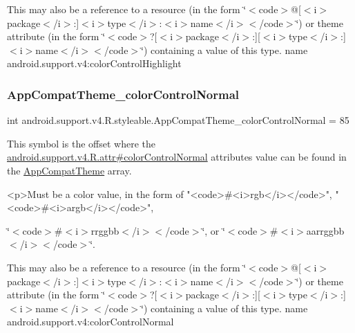 This may also be a reference to a resource (in the form \char`\"{}$<$code$>$@\mbox{[}$<$i$>$package$<$/i$>$\+:\mbox{]}$<$i$>$type$<$/i$>$\+:$<$i$>$name$<$/i$>$$<$/code$>$\char`\"{}) or theme attribute (in the form \char`\"{}$<$code$>$?\mbox{[}$<$i$>$package$<$/i$>$\+:\mbox{]}\mbox{[}$<$i$>$type$<$/i$>$\+:\mbox{]}$<$i$>$name$<$/i$>$$<$/code$>$\char`\"{}) containing a value of this type.  name android.\+support.\+v4\+:color\+Control\+Highlight \mbox{\label{classandroid_1_1support_1_1v4_1_1R_1_1styleable_a6b58e52a257785d873805b5e1779ea2b}} 
\subsubsection{\texorpdfstring{App\+Compat\+Theme\+\_\+color\+Control\+Normal}{AppCompatTheme\_colorControlNormal}}
{\footnotesize\ttfamily int android.\+support.\+v4.\+R.\+styleable.\+App\+Compat\+Theme\+\_\+color\+Control\+Normal = 85\hspace{0.3cm}{\ttfamily [static]}}

This symbol is the offset where the \hyperlink{classandroid_1_1support_1_1v4_1_1R_1_1attr_a0f9de63df4df6b2c04f5544914e7b6ae}{android.\+support.\+v4.\+R.\+attr\#color\+Control\+Normal} attribute\textquotesingle{}s value can be found in the \hyperlink{classandroid_1_1support_1_1v4_1_1R_1_1styleable_ac07ebbe62ed977f6dcaadc6397840ace}{App\+Compat\+Theme} array.

\begin{DoxyVerb}      <p>Must be a color value, in the form of "<code>#<i>rgb</i></code>", "<code>#<i>argb</i></code>",
\end{DoxyVerb}
 \char`\"{}$<$code$>$\#$<$i$>$rrggbb$<$/i$>$$<$/code$>$\char`\"{}, or \char`\"{}$<$code$>$\#$<$i$>$aarrggbb$<$/i$>$$<$/code$>$\char`\"{}. 

This may also be a reference to a resource (in the form \char`\"{}$<$code$>$@\mbox{[}$<$i$>$package$<$/i$>$\+:\mbox{]}$<$i$>$type$<$/i$>$\+:$<$i$>$name$<$/i$>$$<$/code$>$\char`\"{}) or theme attribute (in the form \char`\"{}$<$code$>$?\mbox{[}$<$i$>$package$<$/i$>$\+:\mbox{]}\mbox{[}$<$i$>$type$<$/i$>$\+:\mbox{]}$<$i$>$name$<$/i$>$$<$/code$>$\char`\"{}) containing a value of this type.  name android.\+support.\+v4\+:color\+Control\+Normal \mbox{\label{classandroid_1_1support_1_1v4_1_1R_1_1styleable_a7666c3232d0c44882bd1b7b81694ec22}} 
